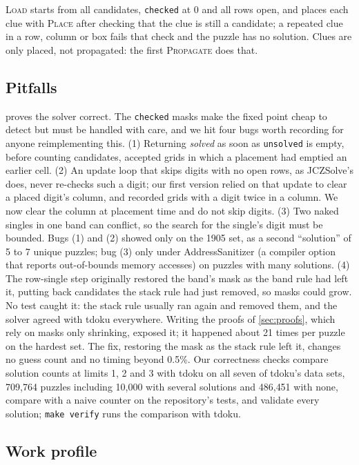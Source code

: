 \documentclass[11pt]{article}
\theoremstyle{definition}
\theoremstyle{plain}
\let\origtextsc\textsc
\renewcommand{\textsc}[1]{\textup{\origtextsc{#1}}}
\begin{document}
\textsc{Load} starts from all candidates, \texttt{checked} at 0 and all rows open, and places each clue with
\textsc{Place} after checking that the clue is still a candidate; a repeated clue in a row, column or box fails that
check and the puzzle has no solution. Clues are only placed, not propagated: the first \textsc{Propagate} does that.

\subsection{Pitfalls}
\label{sec:pitfalls}

 proves the solver correct. The \texttt{checked} masks make the fixed point cheap to detect but must be handled with care, and we hit four bugs
worth recording for anyone reimplementing this. (1) Returning \emph{solved} as soon as \texttt{unsolved} is empty,
before counting candidates, accepted grids in which a placement had emptied an earlier cell. (2) An update loop that
skips digits with no open rows, as JCZSolve's does, never re-checks such a digit; our first version relied on that
update to clear a placed digit's column, and recorded grids with a digit twice in a column. We now clear the column
at placement time and do not skip digits. (3) Two naked singles in one band can conflict, so the search for the
single's digit must be bounded. Bugs (1) and (2) showed only on the 1905 set, as a second ``solution'' of 5 to 7
unique puzzles; bug (3) only under AddressSanitizer (a compiler option that reports
out-of-bounds memory accesses) on puzzles with many solutions. (4) The row-single step originally restored the band's mask as the band rule had left it, putting back candidates
the stack rule had just removed, so masks could grow. No test caught it: the stack rule usually ran again and
removed them, and the solver agreed with tdoku everywhere. Writing the proofs of \cref{sec:proofs}, which rely on masks
only shrinking, exposed it; it happened about 21 times per puzzle on the hardest set. The fix, restoring the mask as
the stack rule left it, changes no guess count and no timing beyond 0.5\%. Our correctness checks compare solution
counts at limits 1, 2 and 3 with tdoku on all seven of tdoku's data sets, 709{,}764 puzzles including 10{,}000 with
several solutions and 486{,}451 with none, compare with a naive counter on the repository's tests, and validate every
solution; \texttt{make verify} runs the comparison with tdoku.

\subsection{Work profile}
\end{document}
